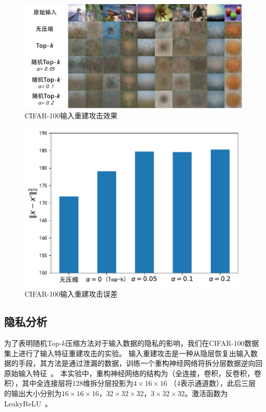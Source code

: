 \begin{figure}[htbp]
    \centering
    \includegraphics[width=\linewidth]{Z_Resources/随机topk_inversion-attack.pdf}
    \caption{CIFAR-100输入重建攻击效果}
    \label{fig:randomized_topk-inversion_attack}
\end{figure}

\begin{figure}[h!]
    \centering
    \includegraphics[width=0.58\linewidth]{Z_Resources/randtopk_cifar-attack-error.pdf}
    \caption{CIFAR-100输入重建攻击误差}
    \label{fig:randomized_topk-attack-error}
\end{figure}


\subsection{隐私分析}
为了表明随机Top-$k$压缩方法对于输入数据的隐私的影响，我们在CIFAR-100数据集上进行了输入特征重建攻击的实验。
%
输入重建攻击是一种从隐层恢复出输入数据的手段，其方法是通过泄漏的数据，训练一个重构神经网络将拆分层数据逆向回原始输入特征~\cite{hezecheng_2019_model_inversion_attack,vepakomma2020nopeek}。
%
本实验中，重构神经网络的结构为（全连接，卷积，反卷积，卷积），其中全连接层将128维拆分层投影为$4 \times 16\times 16$ （4表示通道数），此后三层的输出大小分别为$16\times 16 \times  16$，$32\times 32 \times 32$，$3\times 32 \times 32$。激活函数为LeakyReLU~\cite{maas2013leaky_relu}。


